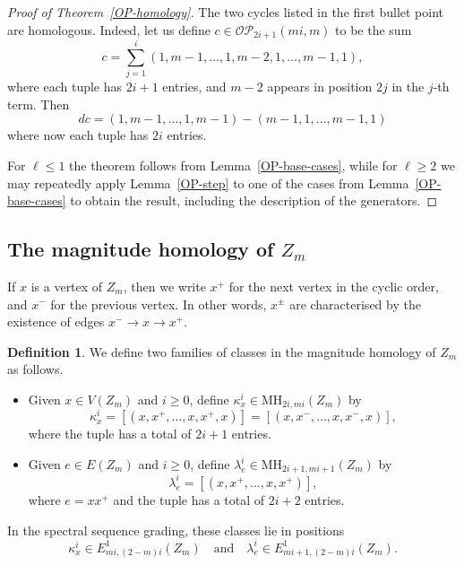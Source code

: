 \documentclass[a4paper, 11 pt, oneside, reqno]{amsart}
\numberwithin{lemma}{section}
\theoremstyle{definition}
\newtheorem{definition}[lemma]{Definition}
\newcommand{\OP}{\mathcal{OP}}
\newcommand{\MH}{\mathrm{MH}}
\begin{document}
\begin{proof}[Proof of Theorem~\ref{OP-homology}]
    The two cycles listed in the first bullet point
    are homologous. 
    Indeed, let us define
    $c\in\OP_{2i+1}(mi,m)$ to be the sum
    \[
        c
        =
        \sum_{j=1}^i
        (1,m-1,\ldots,1,m-2,1,\ldots,m-1,1),
    \]
    where each tuple has $2i+1$ entries,
    and $m-2$ appears in position $2j$ in the $j$-th term.
    Then
    \[
        dc
        =
        (1,m-1,\ldots,1,m-1)
        -
        (m-1,1,\ldots,m-1,1)
    \]
    where now each tuple has $2i$ entries.
    
    For $\ell\leq 1$ the theorem follows from 
    Lemma~\ref{OP-base-cases},
    while for $\ell\geq 2$ we may repeatedly apply
    Lemma~\ref{OP-step} to one of the cases from 
    Lemma~\ref{OP-base-cases} to obtain the result,
    including the description of the  generators.
\end{proof}



\subsection{The magnitude homology of $Z_m$}

If $x$ is a vertex of $Z_m$, then we write $x^+$ for
the next vertex in the cyclic order, and $x^-$ for
the previous vertex.
In other words, $x^\pm$ are characterised by 
the existence of edges $x^-\to x\to x^+$.


\begin{definition}
    We define two families of classes in the magnitude
    homology of $Z_m$ as follows.
    \begin{itemize}
        \item
        Given $x\in V(Z_m)$ and $i\geq 0$,
        define $\kappa_x^i\in\MH_{2i,mi}(Z_m)$
        by
        \[
            \kappa_x^i
            =
            [
                (x,x^+,\ldots,x,x^+,x)
            ]
            =
            [
                (x,x^-,\ldots,x,x^-,x)
            ],
        \]
        where the tuple has a total of $2i+1$ entries.

        \item
        Given $e\in E(Z_m)$ and $i\geq 0$,
        define $\lambda^i_e\in\MH_{2i+1,mi+1}(Z_m)$
        by 
        \[
            \lambda_e^i
            =
            [
                (x,x^+,\ldots,x,x^+)
            ],
        \]
        where $e=xx^+$ and the tuple has a total of 
        $2i+2$ entries.
    \end{itemize}
    In the spectral sequence grading, 
    these classes lie in positions
    \[
        \kappa^i_x\in E^1_{mi,(2-m)i}(Z_m)
        \quad
        \text{and}
        \quad
        \lambda^i_e\in E^1_{mi+1,(2-m)i}(Z_m).
    \]
\end{definition}
\end{document}
